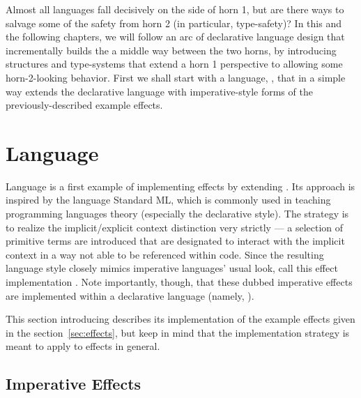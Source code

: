 Almost all languages fall decisively on the side of horn 1, but are there ways to salvage some of the safety from horn 2 (in particular, type-safety)?
In this and the following chapters, we will follow an arc of declarative language design that incrementally builds the a middle way between the two horns, by introducing structures and type-systems that extend a horn 1 perspective to allowing some horn-2-looking behavior.
First we shall start with a language, \LangB, that in a simple way extends the declarative language \LangA with imperative-style forms of the previously-described example effects.

\section{Language \LangB}

Language \LangB is a first example of implementing effects by extending \LangA.
Its approach is inspired by the language Standard ML, which is commonly used in teaching programming languages theory (especially the declarative style).
The strategy is to realize the implicit/explicit context distinction very strictly --- a selection of primitive terms are introduced that are designated to interact with the implicit context in a way not able to be referenced within \LangB code.
Since the resulting language style closely mimics imperative languages' usual look, call this effect implementation .
Note importantly, though, that these dubbed imperative effects are implemented within a declarative language (namely, \LangB).

This section introducing \LangB describes its implementation of the example effects given in the section~\ref{sec:effects}, but keep in mind that the implementation strategy is meant to apply to effects in general.

\subsection{Imperative Effects}

